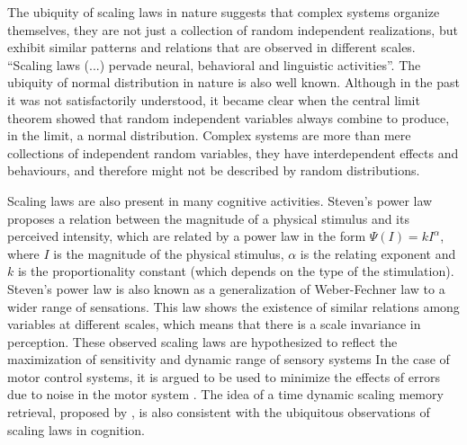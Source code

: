 The ubiquity of scaling laws in nature suggests that complex systems organize themselves,
they are not just a collection of random independent realizations, but exhibit similar patterns
and relations that are observed in different scales. ``Scaling laws (...) pervade neural,
behavioral and linguistic activities''\citep{kello2010}. The ubiquity of normal distribution in 
nature is also well known. Although in the past it was not satisfactorily understood, it became clear
when the central limit theorem showed that random independent variables always combine to
produce, in the limit, a normal distribution. Complex systems are more than mere collections
of independent random variables, they have interdependent effects and behaviours, and therefore
might not be described by random distributions.

Scaling laws are also present in many cognitive activities. 
Steven's power law \citep{stevens1957} proposes a relation
between the magnitude of a physical stimulus and its perceived intensity, which are related 
by a power law in the form $\Psi(I) = k I^\alpha$, where $I$ is the magnitude of the physical
stimulus, $\alpha$ is the relating exponent and $k$ is the proportionality constant (which depends
on the type of the stimulation). Steven's power law is also known as a 
generalization of Weber-Fechner law to a wider range of sensations.
This law shows the existence of similar relations among variables at different
scales, which means that there is a scale invariance in perception.
These observed scaling laws are hypothesized 
to reflect the maximization of sensitivity and dynamic range of sensory systems \citep{copelli2007}
In the case of motor control systems, it is argued to be used to minimize the effects
of errors due to noise in the motor system \citep{harris1988}. The idea of a time dynamic scaling
memory retrieval, proposed by \cite{gordon2007}, is also consistent with the ubiquitous 
observations of scaling laws in cognition.

